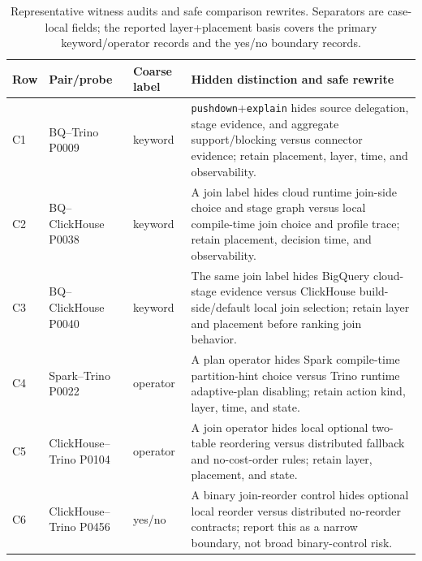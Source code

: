 \begin{table}[t]
\centering
\caption{Representative witness audits and safe comparison rewrites.  Separators are case-local fields; the reported layer+placement basis covers the primary keyword/operator records and the yes/no boundary records.}
\label{tab:cases}
\footnotesize
\setlength{\tabcolsep}{1.5pt}
\renewcommand{\arraystretch}{1.04}
\begin{tabular}{@{}>{\raggedright\arraybackslash}p{0.24in}
                >{\raggedright\arraybackslash}p{0.57in}
                >{\raggedright\arraybackslash}p{0.42in}
                >{\raggedright\arraybackslash}p{1.78in}@{}}
\toprule
Row & Pair/probe & Coarse label & Hidden distinction and safe rewrite \\
\midrule
C1 & BQ--Trino P0009 & keyword & \texttt{pushdown}+\texttt{explain} hides source delegation, stage evidence, and aggregate support/blocking versus connector evidence; retain placement, layer, time, and observability. \\
C2 & BQ--ClickHouse P0038 & keyword & A join label hides cloud runtime join-side choice and stage graph versus local compile-time join choice and profile trace; retain placement, decision time, and observability. \\
C3 & BQ--ClickHouse P0040 & keyword & The same join label hides BigQuery cloud-stage evidence versus ClickHouse build-side/default local join selection; retain layer and placement before ranking join behavior. \\
C4 & Spark--Trino P0022 & operator & A plan operator hides Spark compile-time partition-hint choice versus Trino runtime adaptive-plan disabling; retain action kind, layer, time, and state. \\
C5 & ClickHouse--Trino P0104 & operator & A join operator hides local optional two-table reordering versus distributed fallback and no-cost-order rules; retain layer, placement, and state. \\
C6 & ClickHouse--Trino P0456 & yes/no & A binary join-reorder control hides optional local reorder versus distributed no-reorder contracts; report this as a narrow boundary, not broad binary-control risk. \\
\bottomrule
\end{tabular}
\end{table}
